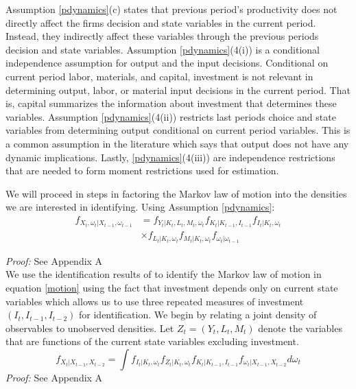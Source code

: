 \documentclass{article}
\begin{document}
Assumption \eqref{pdynamics}(c) states that previous period's productivity does not directly affect the firms decision and state variables in the current period. Instead, they indirectly affect these variables through the previous periods decision and state variables. Assumption \eqref{pdynamics}(4(i)) is a conditional independence assumption for output and the input decisions. Conditional on current period labor, materials, and capital, investment is not relevant in determining output, labor, or material input decisions in the current period. That is, capital summarizes the information about investment that determines these variables. Assumption \eqref{pdynamics}(4(ii)) restricts last periods choice and state variables from determining output conditional on current period variables. This is a common assumption in the literature which says that output does not have any dynamic implications. Lastly, \eqref{pdynamics}(4(iii)) are independence restrictions that are needed to form moment restrictions used for estimation.

We will proceed in steps in factoring the Markov law of motion into the densities we are interested in identifying. Using Assumption \eqref{pdynamics}:
\begin{equation} \label{motion}
    \begin{split}
        f_{X_{t}, \omega_{t}|X_{t-1}, \omega_{t-1}}&=f_{Y_{t}|K_{t}, L_{t}, M_{t}, \omega_{t}}f_{K_{t}|K_{t-1}, I_{t-1}}f_{I_{t}|K_{t}, \omega_{t}}\\
        &\times f_{L_{t}|K_{t}, \omega_{t}}f_{M_{t}|K_{t}, \omega_{t}}f_{\omega_{t}|\omega_{t-1}}
    \end{split}
\end{equation} 

\textit{Proof:} See Appendix A\\

We use the identification results of \cite{Hu2012} to identify the Markov law of motion in equation \eqref{motion} using the fact that investment depends only on current state variables which allows us to use three repeated measures of investment $(I_{t}, I_{t-1}, I_{t-2})$ for identification. We begin by relating a joint density of observables to unobserved densities. Let $Z_{t}=(Y_{t}, L_{t}, M_{t})$ denote the variables that are functions of the current state variables excluding investment.
\begin{equation} \label{obs}
f_{X_{t}|X_{t-1}, X_{t-2}}=\int f_{I_{t}|K_{t}, \omega_{t}}f_{Z_{t}|K_{t}, \omega_{t}}f_{K_{t}|K_{t-1}, I_{t-1}}f_{\omega_{t}|X_{t-1}, X_{t-2}}d\omega_{t}
\end{equation}
\textit{Proof:} See Appendix A\\
\end{document}
